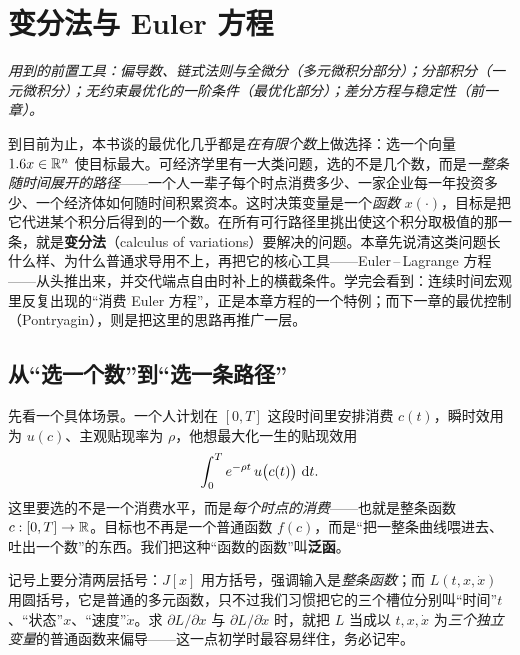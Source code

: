 \chapter{变分法与 Euler 方程}
\label{ch:calcvar}

\noindent\emph{用到的前置工具：偏导数、链式法则与全微分（多元微积分部分）；分部积分（一元微积分）；无约束最优化的一阶条件（最优化部分）；差分方程与稳定性（前一章）。}
\medskip

到目前为止，本书谈的最优化几乎都是\emph{在有限个数}上做选择：选一个向量 $1.6 x\in\mathbb{R}^n$ 使目标最大。可经济学里有一大类问题，选的不是几个数，而是\emph{一整条随时间展开的路径}——一个人一辈子每个时点消费多少、一家企业每一年投资多少、一个经济体如何随时间积累资本。这时决策变量是一个\emph{函数} $x(\cdot)$，目标是把它代进某个积分后得到的一个数。在所有可行路径里挑出使这个积分取极值的那一条，就是\textbf{变分法}（calculus of variations）要解决的问题。本章先说清这类问题长什么样、为什么普通求导用不上，再把它的核心工具——Euler\,–\,Lagrange 方程——从头推出来，并交代端点自由时补上的横截条件。学完会看到：连续时间宏观里反复出现的``消费 Euler 方程''，正是本章方程的一个特例；而下一章的最优控制（Pontryagin），则是把这里的思路再推广一层。

\section{从``选一个数''到``选一条路径''}
\label{sec:calcvar-1}

先看一个具体场景。一个人计划在 $[0,T]$ 这段时间里安排消费 $c(t)$，瞬时效用为 $u(c)$、主观贴现率为 $\rho$，他想最大化一生的贴现效用
\[
    \int_0^T e^{-\rho t}\,u\bigl(c(t)\bigr)\,\mathop{}\!\mathrm{d} t .
\]
这里要选的不是一个消费水平，而是\emph{每个时点的消费}——也就是整条函数 $c:[0,T]\to\mathbb{R}$。目标也不再是一个普通函数 $f(c)$，而是``把一整条曲线喂进去、吐出一个数''的东西。我们把这种``函数的函数''叫\textbf{泛函}。


记号上要分清两层括号：$J[x]$ 用方括号，强调输入是\emph{整条函数}；而 $L(t,x,\dot x)$ 用圆括号，它是普通的多元函数，只不过我们习惯把它的三个槽位分别叫``时间''$t$、``状态''$x$、``速度''$\dot x$。求 $\partial L/\partial x$ 与 $\partial L/\partial\dot x$ 时，就把 $L$ 当成以 $t,x,\dot x$ 为\emph{三个独立变量}的普通函数来偏导——这一点初学时最容易绊住，务必记牢。

